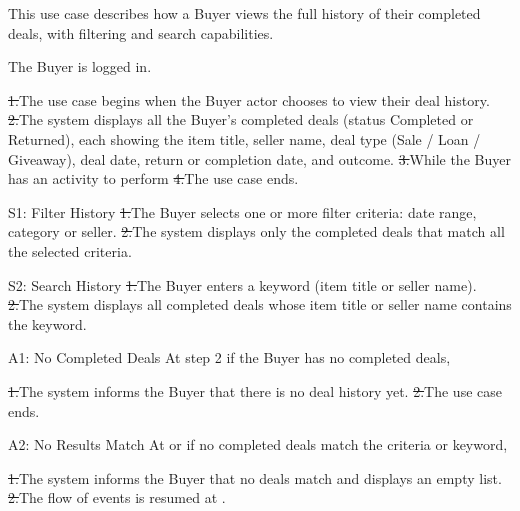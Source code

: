 This use case describes how a Buyer views the full history of their completed deals, with filtering and search capabilities.\par
{}
The Buyer is logged in.\par
{}
\st{1.}{The use case begins when the Buyer actor chooses to view their deal history.}
\st{2.}{The system displays all the Buyer's completed deals (status Completed or Returned), each showing the item title, seller name, deal type (Sale / Loan / Giveaway), deal date, return or completion date, and outcome.}
\st{3.}{While the Buyer has an activity to perform}
\st{4.}{The use case ends.}
\begin{flowblock}{S1: Filter History}
\st{1.}{The Buyer selects one or more filter criteria: date range, category or seller.}
\st{2.}{The system displays only the completed deals that match all the selected criteria.}
\end{flowblock}
\begin{flowblock}{S2: Search History}
\st{1.}{The Buyer enters a keyword (item title or seller name).}
\st{2.}{The system displays all completed deals whose item title or seller name contains the keyword.}
\end{flowblock}
\begin{flowblock}{A1: No Completed Deals}
At step 2 if the Buyer has no completed deals,\par
\st{1.}{The system informs the Buyer that there is no deal history yet.}
\st{2.}{The use case ends.}
\end{flowblock}
\begin{flowblock}{A2: No Results Match}
At  or  if no completed deals match the criteria or keyword,\par
\st{1.}{The system informs the Buyer that no deals match and displays an empty list.}
\st{2.}{The flow of events is resumed at .}
\end{flowblock}

